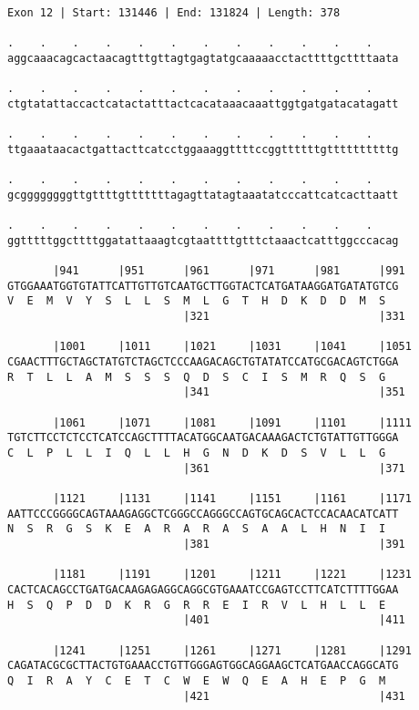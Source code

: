 \documentclass{article}
\begin{document}
\begin{Verbatim}
Exon 12 | Start: 131446 | End: 131824 | Length: 378
 
.    .    .    .    .    .    .    .    .    .    .    .    
aggcaaacagcactaacagtttgttagtgagtatgcaaaaacctacttttgcttttaata
  
.    .    .    .    .    .    .    .    .    .    .    .    
ctgtatattaccactcatactatttactcacataaacaaattggtgatgatacatagatt
  
.    .    .    .    .    .    .    .    .    .    .    .    
ttgaaataacactgattacttcatcctggaaaggttttccggttttttgttttttttttg
  
.    .    .    .    .    .    .    .    .    .    .    .    
gcggggggggttgttttgtttttttagagttatagtaaatatcccattcatcacttaatt
  
.    .    .    .    .    .    .    .    .    .    .    .    
ggtttttggcttttggatattaaagtcgtaattttgtttctaaactcatttggcccacag
  
       |941      |951      |961      |971      |981      |991
GTGGAAATGGTGTATTCATTGTTGTCAATGCTTGGTACTCATGATAAGGATGATATGTCG
V  E  M  V  Y  S  L  L  S  M  L  G  T  H  D  K  D  D  M  S  
                           |321                          |331
  
       |1001     |1011     |1021     |1031     |1041     |1051
CGAACTTTGCTAGCTATGTCTAGCTCCCAAGACAGCTGTATATCCATGCGACAGTCTGGA
R  T  L  L  A  M  S  S  S  Q  D  S  C  I  S  M  R  Q  S  G  
                           |341                          |351
  
       |1061     |1071     |1081     |1091     |1101     |1111
TGTCTTCCTCTCCTCATCCAGCTTTTACATGGCAATGACAAAGACTCTGTATTGTTGGGA
C  L  P  L  L  I  Q  L  L  H  G  N  D  K  D  S  V  L  L  G  
                           |361                          |371
  
       |1121     |1131     |1141     |1151     |1161     |1171
AATTCCCGGGGCAGTAAAGAGGCTCGGGCCAGGGCCAGTGCAGCACTCCACAACATCATT
N  S  R  G  S  K  E  A  R  A  R  A  S  A  A  L  H  N  I  I  
                           |381                          |391
  
       |1181     |1191     |1201     |1211     |1221     |1231
CACTCACAGCCTGATGACAAGAGAGGCAGGCGTGAAATCCGAGTCCTTCATCTTTTGGAA
H  S  Q  P  D  D  K  R  G  R  R  E  I  R  V  L  H  L  L  E  
                           |401                          |411
  
       |1241     |1251     |1261     |1271     |1281     |1291
CAGATACGCGCTTACTGTGAAACCTGTTGGGAGTGGCAGGAAGCTCATGAACCAGGCATG
Q  I  R  A  Y  C  E  T  C  W  E  W  Q  E  A  H  E  P  G  M  
                           |421                          |431
  

\end{Verbatim}
\end{document}
